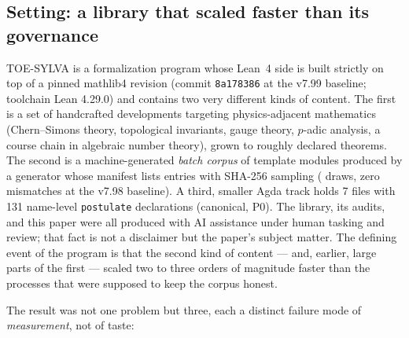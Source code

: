 
\subsection{Setting: a library that scaled faster than its governance}
\label{sec:setting}
TOE-SYLVA is a formalization program whose Lean~4 side is built
strictly on top of a pinned mathlib4 revision (commit
\texttt{8a178386} at the v7.99 baseline; toolchain Lean 4.29.0) and
contains two very different kinds of content. The first is a set of
handcrafted developments targeting physics-adjacent mathematics
(Chern--Simons theory, topological invariants, gauge theory,
$p$-adic analysis, a course chain in algebraic number theory), grown
to roughly  declared theorems. The second is a
machine-generated \emph{batch corpus} of  template
modules produced by a generator whose manifest lists 
entries with SHA-256 sampling ( draws, zero mismatches at
the v7.98 baseline). A third, smaller Agda track holds 7 files with
131 name-level \texttt{postulate} declarations (canonical, P0). The
library, its audits, and this paper were all produced with AI
assistance under human tasking and review; that fact is not a
disclaimer but the paper's subject matter. The defining event of the
program is that the second kind of content --- and, earlier, large
parts of the first --- scaled two to three orders of magnitude faster
than the processes that were supposed to keep the corpus honest.

The result was not one problem but three, each a distinct failure
mode of \emph{measurement}, not of taste:

